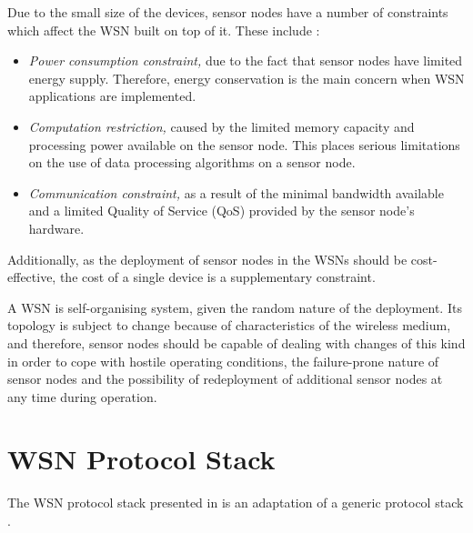 Due to the small size of the devices, sensor nodes have a number of constraints
which affect the WSN built on top of it. These include \cite{yao:qps}:
\begin{itemize}
  \item \emph{Power consumption constraint,} due to the fact that sensor nodes
  have limited energy supply. Therefore, energy conservation is the main concern when
  WSN applications are implemented.
  \item \emph{Computation restriction,} caused by the limited memory
  capacity and processing power available on the sensor node. This places
  serious limitations on the use of data processing algorithms on a sensor node.
  
  \item \emph{Communication constraint,} as a result of the minimal bandwidth available and a
  limited Quality of Service (QoS) provided by the sensor node's hardware. 
\end{itemize}

Additionally, as the deployment of sensor nodes in the WSNs should be
cost-effective, the cost of a single device is a supplementary constraint.

A WSN is self-organising system, given the random nature of the deployment. Its
topology is subject to change because of characteristics of the wireless medium,
and therefore, sensor nodes should be capable of dealing with changes of this kind in order to cope with hostile operating
conditions, the failure-prone nature of sensor nodes and the possibility of
redeployment of additional sensor nodes at any time during operation.

\section{WSN Protocol Stack} \label{sec:WSNProtStack}

The WSN protocol stack presented in \cite{SensorSurveyAkyildiz:2002} is an
adaptation of a generic protocol stack \cite{ComputerNetworksTannenbaum:2003}.


